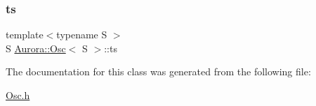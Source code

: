 \mbox{\label{class_aurora_1_1_osc_a2c7ae380eade4eee2e6035856ed0dcbe}} 
\subsubsection{\texorpdfstring{ts}{ts}}
{\footnotesize\ttfamily template$<$typename S $>$ \\
S \hyperlink{class_aurora_1_1_osc}{Aurora\+::\+Osc}$<$ S $>$\+::ts\hspace{0.3cm}{\ttfamily [protected]}}



The documentation for this class was generated from the following file\+:\begin{DoxyCompactItemize}
\item 
\hyperlink{_osc_8h}{Osc.\+h}\end{DoxyCompactItemize}
